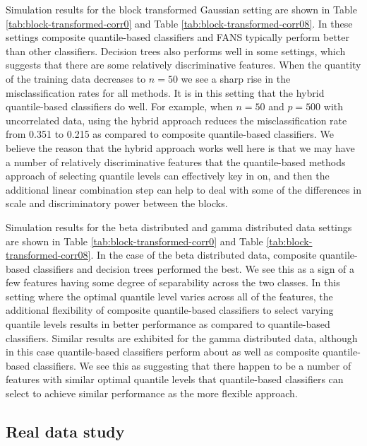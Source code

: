 Simulation results for the block transformed Gaussian setting are shown in Table
\ref{tab:block-transformed-corr0} and Table \ref{tab:block-transformed-corr08}.
In these settings composite quantile-based classifiers and FANS typically
perform better than other classifiers.  Decision trees also performs well in
some settings, which suggests that there are some relatively discriminative
features.  When the quantity of the training data decreases to $n = 50$ we see a
sharp rise in the misclassification rates for all methods.  It is in this
setting that the hybrid quantile-based classifiers do well.  For example, when
$n = 50$ and $p = 500$ with uncorrelated data, using the hybrid approach reduces
the misclassification rate from 0.351 to 0.215 as compared to composite
quantile-based classifiers.  We believe the reason that the hybrid approach
works well here is that we may have a number of relatively discriminative
features that the quantile-based methods approach of selecting quantile levels
can effectively key in on, and then the additional linear combination step can
help to deal with some of the differences in scale and discriminatory power
between the blocks.

Simulation results for the beta distributed and gamma distributed data settings
are shown in Table \ref{tab:block-transformed-corr0} and Table
\ref{tab:block-transformed-corr08}.  In the case of the beta distributed data,
composite quantile-based classifiers and decision trees performed the best.  We
see this as a sign of a few features having some degree of separability across
the two classes.  In this setting where the optimal quantile level varies across
all of the features, the additional flexibility of composite quantile-based
classifiers to select varying quantile levels results in better performance as
compared to quantile-based classifiers.  Similar results are exhibited for the
gamma distributed data, although in this case quantile-based classifiers perform
about as well as composite quantile-based classifiers.  We see this as
suggesting that there happen to be a number of features with similar optimal
quantile levels that quantile-based classifiers can select to achieve similar
performance as the more flexible approach.




\subsection{Real data study}
\label{sec:real-data-study}

